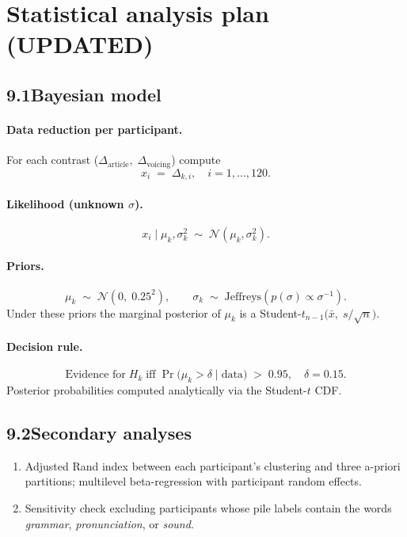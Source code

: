 \documentclass[12pt]{article}
\begin{document}
\section{Statistical analysis plan \,(UPDATED)}

\subsection{9.1\quad Bayesian model}

\paragraph{Data reduction per participant.}
For each contrast (\(\Delta_{\text{article}},\;\Delta_{\text{voicing}}\)) compute
\[
x_i \;=\; \Delta_{k,i},\quad i = 1,\dots, 120.
\]

\paragraph{Likelihood (unknown $\sigma$).}
\[
x_i \mid \mu_k,\sigma_k^2 \;\sim\; \mathcal N(\mu_k,\sigma_k^2).
\]

\paragraph{Priors.}
\[
\mu_k \;\sim\; \mathcal N(0,\;0.25^2),\qquad
\sigma_k \;\sim\; \text{Jeffreys}(p(\sigma)\propto\sigma^{-1}).
\]
Under these priors the marginal posterior of \(\mu_k\) is a
Student-\(t_{n-1}\bigl(\bar x,\; s/\sqrt n\bigr)\).

\paragraph{Decision rule.}
\[
\text{Evidence for}\;H_{k}\;\text{iff}
\;\Pr\!\bigl(\mu_k > \delta \mid \text{data}\bigr)\;>\;0.95,
\quad \delta = 0.15.
\]
Posterior probabilities computed analytically via the
Student-\(t\) CDF.

\subsection{9.2\quad Secondary analyses}
\begin{enumerate}
\item Adjusted Rand index between each participant’s clustering and three a-priori partitions; multilevel beta-regression with participant random effects.
\item Sensitivity check excluding participants whose pile labels contain the words \textit{grammar}, \textit{pronunciation}, or \textit{sound}.
\end{enumerate}
\end{document}
